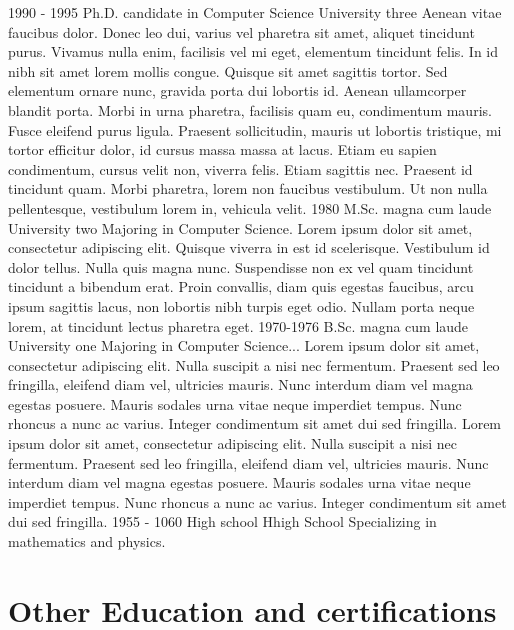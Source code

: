 \documentclass[letterpaper]{resume} %
\begin{document}
{    \begin{twenty}
      \twentyitem
        {1990 - 1995}
        {Ph.D. {\normalfont candidate in Computer Science}}
        {University three}
        {Aenean vitae faucibus dolor. Donec leo dui, varius vel pharetra sit amet, aliquet tincidunt purus. Vivamus nulla enim, facilisis vel mi eget, elementum tincidunt felis. In id nibh sit amet lorem mollis congue. Quisque sit amet sagittis tortor. Sed elementum ornare nunc, gravida porta dui lobortis id. Aenean ullamcorper blandit porta. Morbi in urna pharetra, facilisis quam eu, condimentum mauris. Fusce eleifend purus ligula. Praesent sollicitudin, mauris ut lobortis tristique, mi tortor efficitur dolor, id cursus massa massa at lacus. Etiam eu sapien condimentum, cursus velit non, viverra felis. Etiam sagittis nec. Praesent id tincidunt quam. Morbi pharetra, lorem non faucibus vestibulum. Ut non nulla pellentesque, vestibulum lorem in, vehicula velit.}
      \twentyitem
        {1980}
        {M.Sc. magna cum laude}
        {University two}
        {Majoring in Computer Science. Lorem ipsum dolor sit amet, consectetur adipiscing elit. Quisque viverra in est id scelerisque. Vestibulum id dolor tellus. Nulla quis magna nunc. Suspendisse non ex vel quam tincidunt tincidunt a bibendum erat. Proin convallis, diam quis egestas faucibus, arcu ipsum sagittis lacus, non lobortis nibh turpis eget odio. Nullam porta neque lorem, at tincidunt lectus pharetra eget.}
      \twentyitem
        {1970-1976}
        {B.Sc. magna cum laude}
        {University one}
        {Majoring in Computer Science... Lorem ipsum dolor sit amet, consectetur adipiscing elit. Nulla suscipit a nisi nec fermentum. Praesent sed leo fringilla, eleifend diam vel, ultricies mauris. Nunc interdum diam vel magna egestas posuere. Mauris sodales urna vitae neque imperdiet tempus. Nunc rhoncus a nunc ac varius. Integer condimentum sit amet dui sed fringilla. Lorem ipsum dolor sit amet, consectetur adipiscing elit. Nulla suscipit a nisi nec fermentum. Praesent sed leo fringilla, eleifend diam vel, ultricies mauris. Nunc interdum diam vel magna egestas posuere. Mauris sodales urna vitae neque imperdiet tempus. Nunc rhoncus a nunc ac varius. Integer condimentum sit amet dui sed fringilla.}
      \twentyitem
        {1955 - 1060}
        {High school}
        {Hhigh School}
        {Specializing in mathematics and physics.}
    \end{twenty}
    
    \section{Other Education and certifications}
    
}
\end{document}
